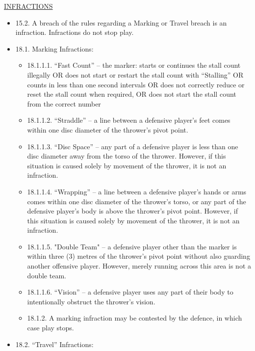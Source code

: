 \begin{center}\underline{\uppercase{infractions}}\end{center}

    \begin{itemize}[noitemsep]
    \tiny
    \item 15.2. A breach of the rules regarding a Marking or Travel breach is an infraction. Infractions do not stop play.
    \item 18.1. Marking Infractions:
        \begin{itemize}
                \item 18.1.1.1. “Fast Count” – the marker: starts or continues the stall count illegally OR does not start or restart the stall count with “Stalling” OR counts in less than one second intervals OR does not correctly reduce or reset the stall count when required, OR does not start the stall count from the correct number
                \item 18.1.1.2. “Straddle” – a line between a defensive player’s feet comes within one disc diameter of the thrower’s pivot point.
                \item 18.1.1.3. “Disc Space” – any part of a defensive player is less than one disc diameter away from the torso of the thrower. However, if this situation is caused solely by movement of the thrower, it is not an infraction.
                \item 18.1.1.4. “Wrapping” – a line between a defensive player’s hands or arms comes within one disc diameter of the thrower’s torso, or any part of the defensive player’s body is above the thrower’s pivot point. However, if this situation is caused solely by movement of the thrower, it is not an infraction.
                \item 18.1.1.5. "Double Team" – a defensive player other than the marker is within three (3) metres of the thrower's pivot point without also guarding another offensive player. However, merely running across this area is not a double team.
                \item 18.1.1.6. “Vision” – a defensive player uses any part of their body to intentionally obstruct the thrower’s vision.
                \item 18.1.2. A marking infraction may be contested by the defence, in which case play stops.
        \end{itemize}
    \item 18.2. “Travel” Infractions:
        \begin{itemize}

\end{itemize}
\end{itemize}
